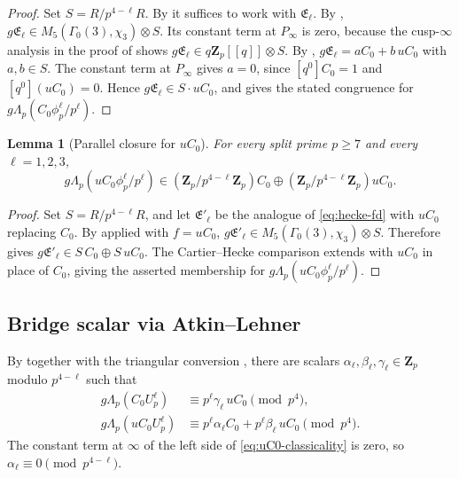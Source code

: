 \documentclass[11pt]{amsart}
\newtheorem{lemma}[theorem]{Lemma}
\theoremstyle{definition}
\theoremstyle{remark}
\newcommand{\Z}{\mathbf{Z}}
\begin{document}
\begin{proof}
Set $S=R/p^{4-\ell}R$. By  it suffices to work with $\mathfrak E_\ell$. By , $g\mathfrak E_\ell\in M_5(\Gamma_0(3),\chi_3)\otimes S$. Its constant term at $P_\infty$ is zero, because the cusp-$\infty$ analysis in the proof of  shows $g\mathfrak E_\ell\in q\Z_p[[q]]\otimes S$. By , $g\mathfrak E_\ell=aC_0+b\,uC_0$ with $a,b\in S$. The constant term at $P_\infty$ gives $a=0$, since $[q^0]C_0=1$ and $[q^0](uC_0)=0$. Hence $g\mathfrak E_\ell\in S\cdot uC_0$, and  gives the stated congruence for $g\Lambda_p(C_0\phi_p^\ell/p^\ell)$.
\end{proof}

\begin{lemma}[Parallel closure for $uC_0$]\label{lem:parallel-KB-closure}
For every split prime $p\ge 7$ and every $\ell=1,2,3$,
\[
g\Lambda_p(uC_0\phi_p^\ell/p^\ell)\in(\Z_p/p^{4-\ell}\Z_p)C_0\oplus(\Z_p/p^{4-\ell}\Z_p)uC_0.
\]
\end{lemma}

\begin{proof}
Set $S=R/p^{4-\ell}R$, and let $\mathfrak E'_\ell$ be the analogue of \eqref{eq:hecke-fd} with $uC_0$ replacing $C_0$. By  applied with $f=uC_0$, $g\mathfrak E'_\ell\in M_5(\Gamma_0(3),\chi_3)\otimes S$. Therefore  gives $g\mathfrak E'_\ell\in S\,C_0\oplus S\,uC_0$. The Cartier--Hecke comparison  extends with $uC_0$ in place of $C_0$, giving the asserted membership for $g\Lambda_p(uC_0\phi_p^\ell/p^\ell)$.
\end{proof}

\subsection{Bridge scalar via Atkin--Lehner}\label{subsec:bridge}

By  together with the triangular conversion , there are scalars $\alpha_\ell,\beta_\ell,\gamma_\ell\in\Z_p$ modulo $p^{4-\ell}$ such that
\begin{align}
g\Lambda_p(C_0U_p^\ell)&\equiv p^\ell\gamma_\ell\,uC_0\pmod{p^4},\label{eq:C0-classicality}\\
g\Lambda_p(uC_0U_p^\ell)&\equiv p^\ell\alpha_\ell C_0+p^\ell\beta_\ell\,uC_0\pmod{p^4}.\label{eq:uC0-classicality}
\end{align}
The constant term at $\infty$ of the left side of \eqref{eq:uC0-classicality} is zero, so $\alpha_\ell\equiv 0\pmod{p^{4-\ell}}$.
\end{document}
